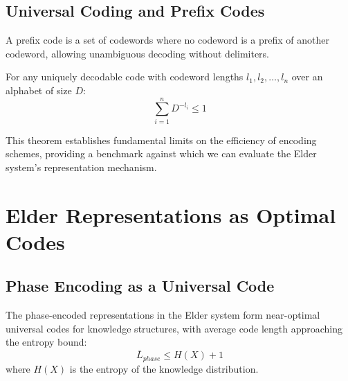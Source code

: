 \subsection{Universal Coding and Prefix Codes}

\begin{definition}
A prefix code is a set of codewords where no codeword is a prefix of another codeword, allowing unambiguous decoding without delimiters.
\end{definition}

\begin{theorem}
For any uniquely decodable code with codeword lengths $l_1, l_2, \ldots, l_n$ over an alphabet of size $D$:
\begin{equation}
\sum_{i=1}^n D^{-l_i} \leq 1
\end{equation}
\end{theorem}

This theorem establishes fundamental limits on the efficiency of encoding schemes, providing a benchmark against which we can evaluate the Elder system's representation mechanism.

\section{Elder Representations as Optimal Codes}

\subsection{Phase Encoding as a Universal Code}

\begin{theorem}
The phase-encoded representations in the Elder system form near-optimal universal codes for knowledge structures, with average code length approaching the entropy bound:
\begin{equation}
\overline{L}_{phase} \leq H(X) + 1
\end{equation}
where $H(X)$ is the entropy of the knowledge distribution.
\end{theorem}

